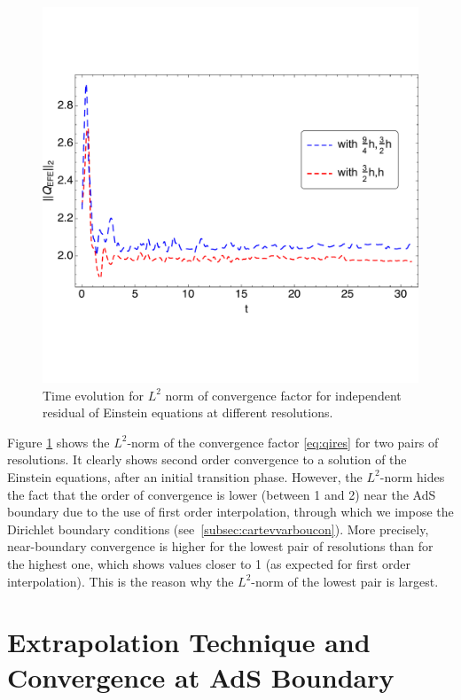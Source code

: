 \documentclass[a4paper,11pt]{article}
\begin{document}
\begin{figure}[h]
        \centering
        \includegraphics[width=5.0in,clip=true]{plots/timeseries/L2norm_iresallconvergence/fullplottL2normdim2boundedrescaledconvergenceiresallallres.pdf}
\parbox{5.0in}{\caption{Time evolution for $L^2$ norm of convergence factor for independent residual of Einstein equations at different resolutions.
        }\label{fig:L2norm_iresallconvergence-crop}}
\end{figure}

Figure \ref{fig:L2norm_iresallconvergence-crop} shows the $L^2$-norm of the convergence factor \eqref{eq:qires} for two pairs of resolutions. It clearly shows second order convergence to a solution of the Einstein equations, after an initial transition phase. However, the $L^2$-norm hides the fact that the order of convergence is lower (between 1 and 2) near the AdS boundary due to the use of first order interpolation, through which we impose the Dirichlet boundary conditions (see~\ref{subsec:cartevvarboucon}). More precisely, near-boundary convergence is higher for the lowest pair of resolutions than for the highest one, which shows values closer to 1 (as expected for first order interpolation). This is the reason why the $L^2$-norm of the lowest pair is largest.

\section{Extrapolation Technique and Convergence at AdS Boundary}\label{sec:extrapconvbdy}
\end{document}
